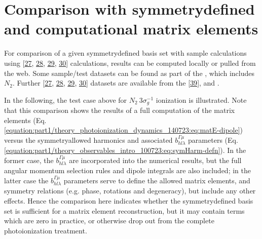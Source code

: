 \documentclass[letterpaper,table,10pt,english]{jupyterBook}
\begin{document}
\section{Comparison with symmetry\sphinxhyphen{}defined and computational matrix elements}
\label{\detokenize{part2/sym-fitting-intro_220423:comparison-with-symmetry-defined-and-computational-matrix-elements}}\label{\detokenize{part2/sym-fitting-intro_220423:sec-basis-sets-comparison-with-abinitio}}
\sphinxAtStartPar
For comparison of a given symmetry\sphinxhyphen{}defined basis set with sample  calculations using  {[}\hyperlink{cite.backmatter/bibliography:id747}{27}, \hyperlink{cite.backmatter/bibliography:id617}{28}, \hyperlink{cite.backmatter/bibliography:id786}{29}, \hyperlink{cite.backmatter/bibliography:id750}{30}{]} calculations, results can be computed locally or pulled from the web. Some sample/test datasets can be found as part of the , which includes \(N_2\). Further  {[}\hyperlink{cite.backmatter/bibliography:id747}{27}, \hyperlink{cite.backmatter/bibliography:id617}{28}, \hyperlink{cite.backmatter/bibliography:id786}{29}, \hyperlink{cite.backmatter/bibliography:id750}{30}{]} datasets are available from the  {[}\hyperlink{cite.backmatter/bibliography:id665}{39}{]}, and .

\sphinxAtStartPar
In the following, the test case above for \(N_2~3\sigma_g^{-1}\) ionization is illustrated. Note that this comparison shows the results of a full  computation of the matrix elements (Eq. \eqref{equation:part1/theory_photoionization_dynamics_140723:eq:matE-dipole}) versus the symmetry\sphinxhyphen{}allowed harmonics and associated \(b_{hl\lambda}^{\Gamma\mu}\) parameters (Eq. \eqref{equation:part1/theory_observables_intro_100723:eq:symHarm-defn}). In the former case, the \(b_{hl\lambda}^{\Gamma\mu}\) are incorporated into the numerical results, but the full angular momentum selection rules and dipole integrals are also included; in the latter case the \(b_{hl\lambda}^{\Gamma\mu}\) parameters serve to define the allowed matrix elements, and symmetry relations (e.g. phase, rotations and degeneracy), but  include any other effects. Hence the comparison here indicates whether the symmetry\sphinxhyphen{}defined basis set is sufficient for a matrix element reconstruction, but it may contain terms which are zero in practice, or otherwise drop out from the complete photoionization treatment.
\end{document}
